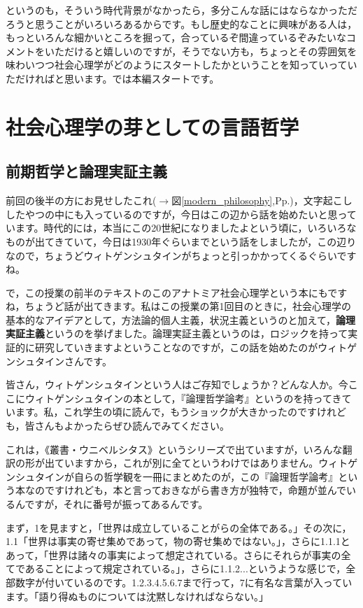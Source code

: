 \documentclass{ltjsbook}
\begin{document}
というのも，そういう時代背景がなかったら，多分こんな話にはならなかっただろうと思うことがいろいろあるからです。もし歴史的なことに興味がある人は，もっといろんな細かいところを掘って，合っているぞ間違っているぞみたいなコメントをいただけると嬉しいのですが，そうでない方も，ちょっとその雰囲気を味わいつつ社会心理学がどのようにスタートしたかということを知っていっていただければと思います。では本編スタートです。

\section{社会心理学の芽としての言語哲学}

\subsection{前期哲学と論理実証主義}
前回の後半の方にお見せしたこれ($\to$図\ref{modern_philosophy},Pp.\pageref{modern_philosophy})，文字起こししたやつの中にも入っているのですが，今日はこの辺から話を始めたいと思っています。時代的には，本当にこの20世紀になりましたよという頃に，いろいろなものが出てきていて，今日は1930年ぐらいまでという話をしましたが，この辺りなので，ちょうどウィトゲンシュタインがちょっと引っかかってくるぐらいですね。

で，この授業の前半のテキストのこのアナトミア社会心理学\parencite{anatomia}という本にもですね，ちょうど話が出てきます。私はこの授業の第1回目のときに，社会心理学の基本的なアイデアとして，方法論的個人主義，状況主義というのと加えて，\textbf{論理実証主義}というのを挙げました。論理実証主義というのは，ロジックを持って実証的に研究していきますよということなのですが，この話を始めたのがウィトゲンシュタインさんです。

皆さん，ウィトゲンシュタインという人はご存知でしょうか？どんな人か。今ここにウィトゲンシュタインの本として，『論理哲学論考』\parencite{Wittgenstein1}というのを持ってきています。私，これ学生の頃に読んで，もうショックが大きかったのですけれども，皆さんもよかったらぜひ読んでみてください。

これは，《叢書・ウニベルシタス》というシリーズで出ていますが，いろんな翻訳の形が出ていますから，これが別に全てというわけではありません。ウィトゲンシュタインが自らの哲学観を一冊にまとめたのが，この『論理哲学論考』という本なのですけれども，本と言っておきながら書き方が独特で，命題が並んでいるんですが，それに番号が振ってあるんです。

まず，1を見ますと，「世界は成立していることがらの全体である。」その次に，1.1「世界は事実の寄せ集めであって，物の寄せ集めではない。」，さらに1.1.1とあって，「世界は諸々の事実によって想定されている。さらにそれらが事実の全てであることによって規定されている。」，さらに1.1.2...というような感じで，全部数字が付いているのです。1.2.3.4.5.6.7まで行って，7に有名な言葉が入っています。「語り得ぬものについては沈黙しなければならない。」
\end{document}
